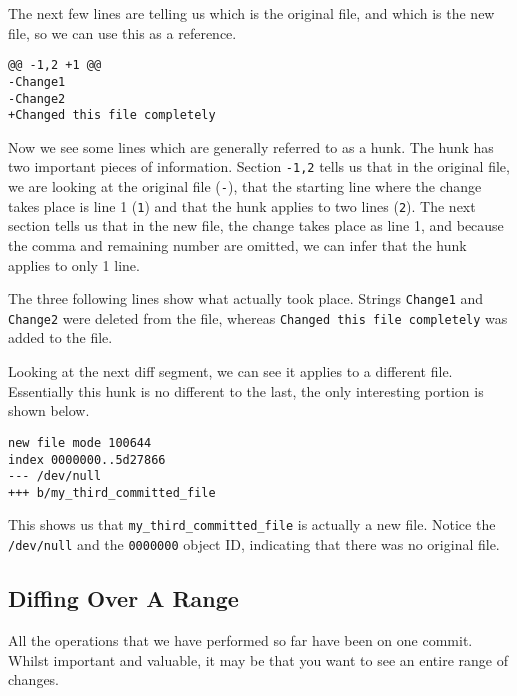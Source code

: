 The next few lines are telling us which is the original file, and which is the new file, so we can use this as a reference.

\begin{Verbatim}[frame=leftline,framerule=1mm,fontsize=\relsize{-3}] 
@@ -1,2 +1 @@
-Change1
-Change2
+Changed this file completely
\end{Verbatim}

Now we see some lines which are generally referred to as a hunk.  The hunk has two important pieces of information.  Section \texttt{-1,2} tells us that in the original file, we are looking at the original file (\texttt{-}), that the starting line where the change takes place is line 1 (\texttt{1}) and that the hunk applies to two lines (\texttt{2}).  The next section tells us that in the new file, the change takes place as line 1, and because the comma and remaining number are omitted, we can infer that the hunk applies to only 1 line.

The three following lines show what actually took place.  Strings \texttt{Change1} and \texttt{Change2} were deleted from the file, whereas \texttt{Changed this file completely} was added to the file.

Looking at the next diff segment, we can see it applies to a different file.  Essentially this hunk is no different to the last, the only interesting portion is shown below.

\begin{Verbatim}[frame=leftline,framerule=1mm,fontsize=\relsize{-3}] 
new file mode 100644
index 0000000..5d27866
--- /dev/null
+++ b/my_third_committed_file
\end{Verbatim}

This shows us that \texttt{my\_third\_committed\_file} is actually a new file.  Notice the \texttt{/dev/null} and the \texttt{0000000} object ID, indicating that there was no original file.

\subsection{Diffing Over A Range}
All the operations that we have performed so far have been on one commit.  Whilst important and valuable, it may be that you want to see an entire range of changes.  


